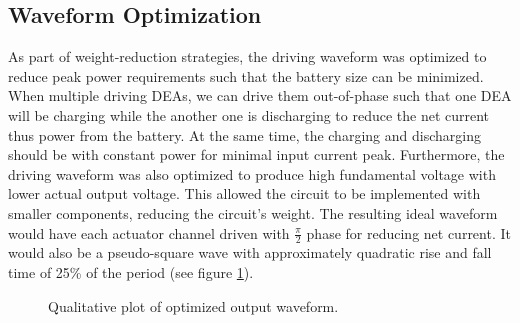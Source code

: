\documentclass[../main.tex]{subfiles}
\begin{document}
\subsection{Waveform Optimization}
As part of weight-reduction strategies, the driving waveform was optimized to reduce peak power requirements such that the battery size can be minimized. When multiple driving DEAs, we can drive them out-of-phase such that one DEA will be charging while the another one is discharging to reduce the net current thus power from the battery. At the same time, the charging and discharging should be with constant power for minimal input current peak. Furthermore, the driving waveform was also optimized to produce high fundamental voltage with lower actual output voltage. This allowed the circuit to be implemented with smaller components, reducing the circuit's weight. The resulting ideal waveform would have each actuator channel driven with $\frac{\pi}{2}$ phase for reducing net current. It would also be a pseudo-square wave with approximately quadratic rise and fall time of 25\% of the period (see figure \ref{fig:waveform}).


\begin{figure}[!htb]
    \centering
    \caption{Qualitative plot of optimized output waveform.}
    \label{fig:waveform}
\end{figure}
\end{document}
